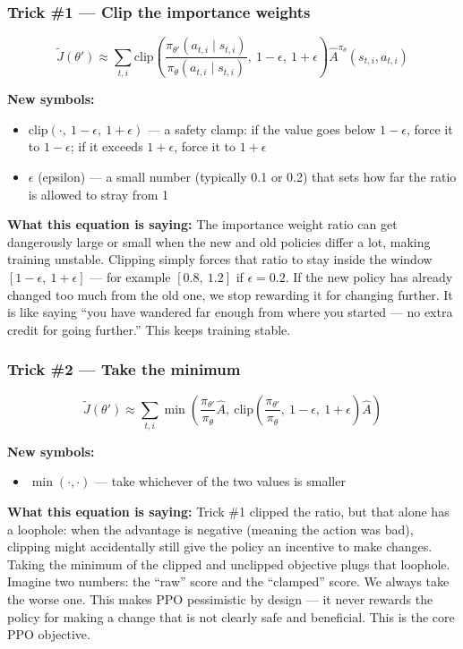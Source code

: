 \subsubsection*{Trick \#1 --- Clip the importance weights}

\[
\tilde{J}(\theta') \approx \sum_{t,i} \mathrm{clip}\!\left(\frac{\pi_{\theta'}(a_{t,i} \mid s_{t,i})}{\pi_\theta(a_{t,i} \mid s_{t,i})},\ 1-\epsilon,\ 1+\epsilon\right) \hat{A}^{\pi_\theta}(s_{t,i}, a_{t,i})
\]

\textbf{New symbols:}
\begin{itemize}
    \item $\mathrm{clip}(\cdot,\ 1-\epsilon,\ 1+\epsilon)$ --- a safety clamp: if the value goes below $1-\epsilon$, force it to $1-\epsilon$; if it exceeds $1+\epsilon$, force it to $1+\epsilon$
    \item $\epsilon$ (epsilon) --- a small number (typically 0.1 or 0.2) that sets how far the ratio is allowed to stray from 1
\end{itemize}

\textbf{What this equation is saying:}
The importance weight ratio can get dangerously large or small when the new and old policies differ a lot, making training unstable. Clipping simply forces that ratio to stay inside the window $[1-\epsilon,\ 1+\epsilon]$ --- for example $[0.8,\ 1.2]$ if $\epsilon = 0.2$. If the new policy has already changed too much from the old one, we stop rewarding it for changing further. It is like saying ``you have wandered far enough from where you started --- no extra credit for going further.'' This keeps training stable.

\subsubsection*{Trick \#2 --- Take the minimum}

\[
\tilde{J}(\theta') \approx \sum_{t,i} \min\!\left(\frac{\pi_{\theta'}}{\pi_\theta}\hat{A},\ \mathrm{clip}\!\left(\frac{\pi_{\theta'}}{\pi_\theta},\ 1-\epsilon,\ 1+\epsilon\right)\hat{A}\right)
\]

\textbf{New symbols:}
\begin{itemize}
    \item $\min(\cdot, \cdot)$ --- take whichever of the two values is smaller
\end{itemize}

\textbf{What this equation is saying:}
Trick \#1 clipped the ratio, but that alone has a loophole: when the advantage is negative (meaning the action was bad), clipping might accidentally still give the policy an incentive to make changes. Taking the minimum of the clipped and unclipped objective plugs that loophole. Imagine two numbers: the ``raw'' score and the ``clamped'' score. We always take the worse one. This makes PPO pessimistic by design --- it never rewards the policy for making a change that is not clearly safe and beneficial. This is the core PPO objective.

